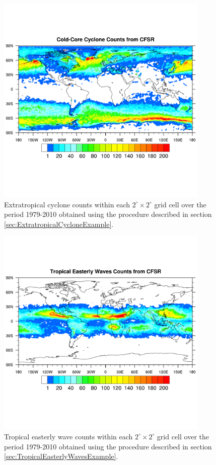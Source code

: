 \documentclass[gmdd, hvmath, online]{copernicus_discussions}
\begin{document}
\begin{figure}[H]
\begin{center}
\includegraphics[width=4in, clip, trim=0.2cm 3.6cm 0.2cm 3.1cm]{plot-cfsr_etc_density.pdf}
\end{center}
\caption{Extratropical cyclone counts within each $2^\circ \times 2^\circ$ grid cell over the period 1979-2010 obtained using the procedure described in section \ref{sec:ExtratropicalCycloneExample}.} \label{fig:ExtratropicalCycloneDensity}
\end{figure}

\begin{figure}[H]
\begin{center}
\includegraphics[width=4in, clip, trim=0.2cm 3.6cm 0.2cm 3.1cm]{plot-cfsr_tew_density.pdf}
\end{center}
\caption{Tropical easterly wave counts within each $2^\circ \times 2^\circ$ grid cell over the period 1979-2010 obtained using the procedure described in section \ref{sec:TropicalEasterlyWavesExample}.} \label{fig:TropicalEasterlyWaveDensity}
\end{figure}
\end{document}
